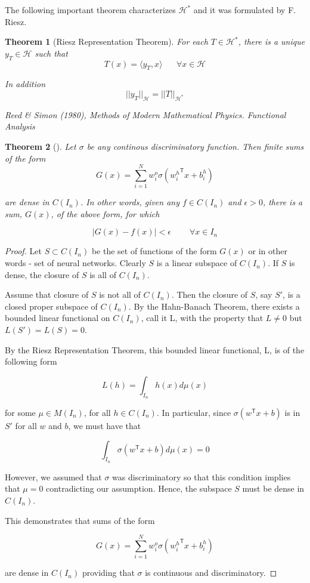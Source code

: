 \documentclass[]{article}
\newtheorem{theorem}{Theorem}[section]
\theoremstyle{definition}
\begin{document}
The following important theorem characterizes $\mathcal{H^*}$ and it was formulated by F. Riesz.

	
\begin{theorem}[Riesz Representation Theorem]
	
	For each $T \in \mathcal{H^*}$, there is a unique $y_T \in \mathcal{H}$ such that $$T(x) = \langle y_T, x \rangle \;\;\;\;\;\; \forall x \in \mathcal{H} $$
	
	
In addition $$||y_T ||_{\mathcal{H}}  = ||T||_{\mathcal{H^*}}$$

Reed \& Simon (1980), Methods of Modern Mathematical Physics. Functional Analysis

\end{theorem}


\begin{theorem}[]
	Let $\sigma$ be any continous discriminatory function. Then finite sums of the form
\begin{equation}
G\left(x\right) = \sum_{i=1}^{N} w^{o}_i \sigma\left({w^h_i}^{\mathsf{T}}x + b^h_i\right)
\end{equation}


are dense in $C(I_n)$. In other words, given any $f \in C(I_n)$ and $\epsilon >0$, there is a sum, $G(x)$, of the above form, for which

$$
|G(x) - f(x)| < \epsilon \;\;\;\;\;\;\;\; \forall x \in I_n
$$
\end{theorem}

\begin{proof}

Let $S \subset C(I_n)$ be the set of functions of the form $G(x)$ or in other words - set of neural networks. Clearly $S$ is a linear subspace of $C(I_n)$. If $S$ is dense, the closure of $S$ is all of $C(I_n)$. 


Assume that closure of $S$ is not all of $C(I_n)$. Then the closure of $S$, say $S'$, is a closed proper subspace of $C(I_n)$. By the Hahn-Banach Theorem, there exists a bounded linear functional on $C(I_n)$, call it L, with the property that $L \neq 0$ but $L(S') = L(S) = 0$.

By the Riesz Representation Theorem, this bounded linear functional, L, is of the following form 

$$
L(h) = \int_{I_n} h(x)d\mu(x)
$$

for some $\mu \in M(I_n)$, for all $h \in C(I_n)$. In particular, since $\sigma(w^\mathsf{T}x + b)$ is in $S'$ for all $w$ and $b$, we must have that

$$
\int_{I_n} \sigma \left(w^\mathsf{T}x + b \right) d\mu(x) = 0 
$$

However, we assumed that $\sigma$ was discriminatory so that this condition implies that $\mu = 0$ contradicting our assumption. Hence, the subspace $S$ must be dense in $C(I_n)$.

This demonstrates that sums of the form

$$
G\left(x\right) = \sum_{i=1}^{N} w^{o}_i \sigma\left({w^h_i}^{\mathsf{T}}x + b^h_i\right)
$$

are dense in $C(I_n)$ providing that $\sigma$ is continuous and discriminatory.

\end{proof}
\end{document}
